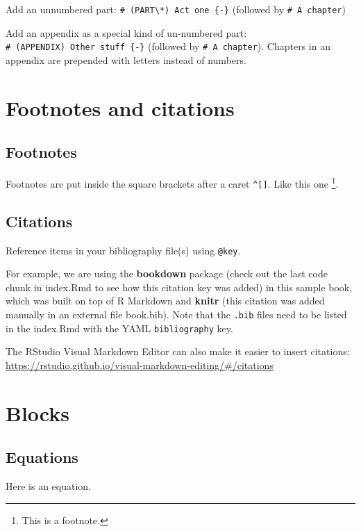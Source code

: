 \documentclass[
]{book}
\theoremstyle{definition}
\theoremstyle{definition}
\theoremstyle{definition}
\theoremstyle{definition}
\theoremstyle{remark}
\begin{document}
Add an unnumbered part: \texttt{\#\ (PART\textbackslash{}*)\ Act\ one\ \{-\}} (followed by \texttt{\#\ A\ chapter})

Add an appendix as a special kind of un-numbered part: \texttt{\#\ (APPENDIX)\ Other\ stuff\ \{-\}} (followed by \texttt{\#\ A\ chapter}). Chapters in an appendix are prepended with letters instead of numbers.

\chapter{Footnotes and citations}\label{footnotes-and-citations}

\section{Footnotes}\label{footnotes}

Footnotes are put inside the square brackets after a caret \texttt{\^{}{[}{]}}. Like this one \footnote{This is a footnote.}.

\section{Citations}\label{citations}

Reference items in your bibliography file(s) using \texttt{@key}.

For example, we are using the \textbf{bookdown} package \citep{R-bookdown} (check out the last code chunk in index.Rmd to see how this citation key was added) in this sample book, which was built on top of R Markdown and \textbf{knitr} \citep{xie2015} (this citation was added manually in an external file book.bib).
Note that the \texttt{.bib} files need to be listed in the index.Rmd with the YAML \texttt{bibliography} key.

The RStudio Visual Markdown Editor can also make it easier to insert citations: \url{https://rstudio.github.io/visual-markdown-editing/\#/citations}

\chapter{Blocks}\label{blocks}

\section{Equations}\label{equations}

Here is an equation.
\end{document}
